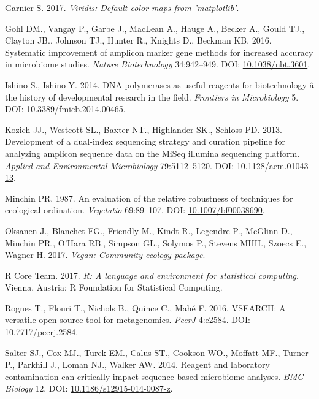 \documentclass[12pt,]{article}
\begin{document}
\hypertarget{ref-viridis_citation_2017}{}
Garnier S. 2017. \emph{Viridis: Default color maps from 'matplotlib'}.

\hypertarget{ref-taq_Gohl_2016}{}
Gohl DM., Vangay P., Garbe J., MacLean A., Hauge A., Becker A., Gould
TJ., Clayton JB., Johnson TJ., Hunter R., Knights D., Beckman KB. 2016.
Systematic improvement of amplicon marker gene methods for increased
accuracy in microbiome studies. \emph{Nature Biotechnology} 34:942--949.
DOI: \href{https://doi.org/10.1038/nbt.3601}{10.1038/nbt.3601}.

\hypertarget{ref-polymerase_Ishino_2014}{}
Ishino S., Ishino Y. 2014. DNA polymerases as useful reagents for
biotechnology â the history of developmental research in the field.
\emph{Frontiers in Microbiology} 5. DOI:
\href{https://doi.org/10.3389/fmicb.2014.00465}{10.3389/fmicb.2014.00465}.

\hypertarget{ref-protocol_Kozich_2013}{}
Kozich JJ., Westcott SL., Baxter NT., Highlander SK., Schloss PD. 2013.
Development of a dual-index sequencing strategy and curation pipeline
for analyzing amplicon sequence data on the MiSeq illumina sequencing
platform. \emph{Applied and Environmental Microbiology} 79:5112--5120.
DOI: \href{https://doi.org/10.1128/aem.01043-13}{10.1128/aem.01043-13}.

\hypertarget{ref-bc_index_Minchin1987}{}
Minchin PR. 1987. An evaluation of the relative robustness of techniques
for ecological ordination. \emph{Vegetatio} 69:89--107. DOI:
\href{https://doi.org/10.1007/bf00038690}{10.1007/bf00038690}.

\hypertarget{ref-vegan_citation}{}
Oksanen J., Blanchet FG., Friendly M., Kindt R., Legendre P., McGlinn
D., Minchin PR., O'Hara RB., Simpson GL., Solymos P., Stevens MHH.,
Szoecs E., Wagner H. 2017. \emph{Vegan: Community ecology package}.

\hypertarget{ref-r_citation_2017}{}
R Core Team. 2017. \emph{R: A language and environment for statistical
computing}. Vienna, Austria: R Foundation for Statistical Computing.

\hypertarget{ref-vsearch_Rognes_2016}{}
Rognes T., Flouri T., Nichols B., Quince C., Mahé F. 2016. VSEARCH: A
versatile open source tool for metagenomics. \emph{PeerJ} 4:e2584. DOI:
\href{https://doi.org/10.7717/peerj.2584}{10.7717/peerj.2584}.

\hypertarget{ref-contamination_Salter2014}{}
Salter SJ., Cox MJ., Turek EM., Calus ST., Cookson WO., Moffatt MF.,
Turner P., Parkhill J., Loman NJ., Walker AW. 2014. Reagent and
laboratory contamination can critically impact sequence-based microbiome
analyses. \emph{BMC Biology} 12. DOI:
\href{https://doi.org/10.1186/s12915-014-0087-z}{10.1186/s12915-014-0087-z}.
\end{document}
